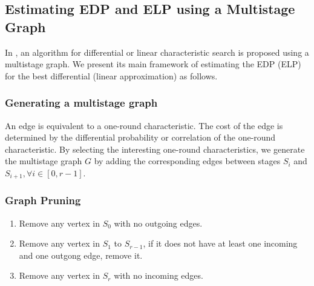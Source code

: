 \subsection{Estimating EDP and ELP using a Multistage Graph}

In \cite{EPRINT:HalVej18}, an algorithm for differential or linear characteristic search is proposed using a multistage graph. We present its main framework of estimating the EDP (ELP) for the best differential (linear approximation) as follows.

\subsubsection{Generating a multistage graph}
An edge is equivalent to a one-round characteristic. The cost of the edge is determined by the differential probability or correlation of the one-round characteristic. By selecting the interesting one-round characteristics, we generate the multistage graph $G$ by adding the corresponding edges between stages $S_i$ and $S_{i+1}, \forall i\in[0,r-1]$. 

\subsubsection{Graph Pruning}
\begin{enumerate}
    \item Remove any vertex in $S_0$ with no outgoing edges.
    \item Remove any vertex in $S_1$ to $S_{r-1}$, if it does not have at least one incoming and one outgong edge, remove it.
    \item Remove any vertex in $S_r$ with no incoming edges.
\end{enumerate}

